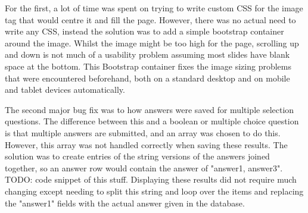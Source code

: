 For the first, a lot of time was spent on trying to write custom CSS for the image tag that would centre it and fill the page. However, there was no actual need to write any CSS, instead the solution was to add a simple bootstrap container around the image. Whilst the image might be too high for the page, scrolling up and down is not much of a usability problem assuming most slides have blank space at the bottom. This Bootstrap container fixes the image sizing problems that were encountered beforehand, both on a standard desktop and on mobile and tablet devices automatically.

The second major bug fix was to how answers were saved for multiple selection questions. The difference between this and a boolean or multiple choice question is that multiple answers are submitted, and an array was chosen to do this. However, this array was not handled correctly when saving these results. The solution was to create entries of the string versions of the answers joined together, so an answer row would contain the answer of "answer1, answer3". TODO: code snippet of this stuff. Displaying these results did not require much changing except needing to split this string and loop over the items and replacing the "answer1" fields with the actual answer given in the database.
\newpage